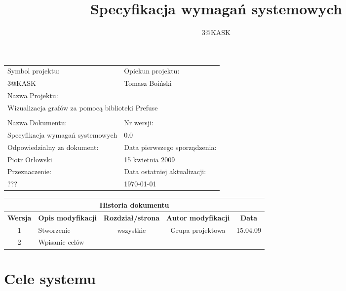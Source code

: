 \documentclass[a4paper,10pt]{article}
\title{Specyfikacja wymagań systemowych}
\author{3@KASK}
\begin{document}



\maketitle


\begin{center}
\begin{tabular}{|p{7cm}|p{7cm}|}
\hline
Symbol projektu: & Opiekun projektu:   \tabularnewline 
3@KASK & Tomasz Boiński    \tabularnewline \hline
\multicolumn{2}{|l|}{Nazwa Projektu: } \tabularnewline
\multicolumn{2}{|l|}{Wizualizacja grafów za pomocą biblioteki Prefuse } \tabularnewline 
\hline
\multicolumn{2}{l}{ } \tabularnewline %
\hline 
Nazwa Dokumentu: & Nr wersji:   \tabularnewline 
Specyfikacja wymagań systemowych & 0.0 \tabularnewline \hline
Odpowiedzialny za dokument: & Data pierwszego sporządzenia:   \tabularnewline 
Piotr Orłowski & 15 kwietnia 2009 \tabularnewline \hline
Przeznaczenie: & Data ostatniej aktualizacji:   \tabularnewline 
??? & \today \tabularnewline \hline
\end{tabular}
\end{center}


\begin{center}
\begin{tabular}{|c|p{4cm}|c|c|c|}
\multicolumn{5}{c}{\textbf{Historia dokumentu}} \tabularnewline \hline
\textbf{Wersja} & \textbf{Opis modyfikacji} & \textbf{Rozdział/strona} & \textbf{Autor modyfikacji} & \textbf{Data} \tabularnewline \hline 
1 & Stworzenie & wszystkie & Grupa projektowa & 15.04.09 \tabularnewline \hline
2 & Wpisanie celów &  & &\tabularnewline \hline
\end{tabular}
 

\end{center}


\newpage
\tableofcontents
\newpage

\section{Cele systemu}

\end{document}
